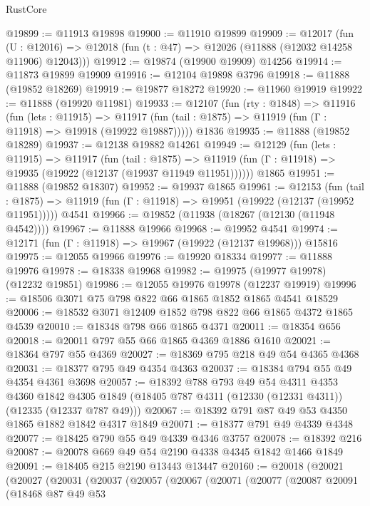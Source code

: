 \begin{lexlean}{RustCore}
\begin{coremodule}
@19899 := @11913 @19898
@19900 := @11910 @19899
@19909 := @12017
    (fun (U : @12016) => @12018 (fun (t : @47) => @12026 (@11888 (@12032 @14258 @11906) @12043)))
@19912 := @19874 (@19900 @19909) @14256
@19914 := @11873 @19899 @19909
@19916 := @12104 @19898 @3796
@19918 := @11888 (@19852 @18269)
@19919 := @19877 @18272
@19920 := @11960 @19919
@19922 := @11888 (@19920 @11981)
@19933 := @12107
    (fun (rty : @1848) =>
    @11916
      (fun (lets : @11915) =>
      @11917 (fun (tail : @1875) => @11919 (fun (Γ : @11918) => @19918 (@19922 @19887)))))
    @1836
@19935 := @11888 (@19852 @18289)
@19937 := @12138 @19882 @14261
@19949 := @12129
    (fun (lets : @11915) =>
    @11917
      (fun (tail : @1875) =>
      @11919 (fun (Γ : @11918) => @19935 (@19922 (@12137 (@19937 @11949 @11951))))))
    @1865
@19951 := @11888 (@19852 @18307)
@19952 := @19937 @1865
@19961 := @12153
    (fun (tail : @1875) => @11919 (fun (Γ : @11918) => @19951 (@19922 (@12137 (@19952 @11951)))))
    @4541
@19966 := @19852 (@11938 (@18267 (@12130 (@11948 @4542))))
@19967 := @11888 @19966
@19968 := @19952 @4541
@19974 := @12171 (fun (Γ : @11918) => @19967 (@19922 (@12137 @19968))) @15816
@19975 := @12055 @19966
@19976 := @19920 @18334
@19977 := @11888 @19976
@19978 := @18338 @19968
@19982 := @19975 (@19977 @19978) (@12232 @19851)
@19986 := @12055 @19976 @19978 (@12237 @19919)
@19996 := @18506 @3071 @75 @798 @822 @66 @1865 @1852 @1865 @4541 @18529
@20006 := @18532 @3071 @12409 @1852 @798 @822 @66 @1865 @4372 @1865 @4539
@20010 := @18348 @798 @66 @1865 @4371
@20011 := @18354 @656
@20018 := @20011 @797 @55 @66 @1865 @4369 @1886 @1610
@20021 := @18364 @797 @55 @4369
@20027 := @18369 @795 @218 @49 @54 @4365 @4368
@20031 := @18377 @795 @49 @4354 @4363
@20037 := @18384 @794 @55 @49 @4354 @4361 @3698
@20057 := @18392
    @788
    @793
    @49
    @54
    @4311
    @4353
    @4360
    @1842
    @4305
    @1849
    (@18405 @787 @4311 (@12330 (@12331 @4311)) (@12335 (@12337 @787 @49)))
@20067 := @18392 @791 @87 @49 @53 @4350 @1865 @1882 @1842 @4317 @1849
@20071 := @18377 @791 @49 @4339 @4348
@20077 := @18425 @790 @55 @49 @4339 @4346 @3757
@20078 := @18392 @216
@20087 := @20078 @669 @49 @54 @2190 @4338 @4345 @1842 @1466 @1849
@20091 := @18405 @215 @2190 @13443 @13447
@20160 := @20018
    (@20021
      (@20027
        (@20031
          (@20037
            (@20057
              (@20067
                (@20071
                  (@20077
                    (@20087
                      @20091
                      (@18468
                        @87
                        @49
                        @53

\end{coremodule}
\end{lexlean}
